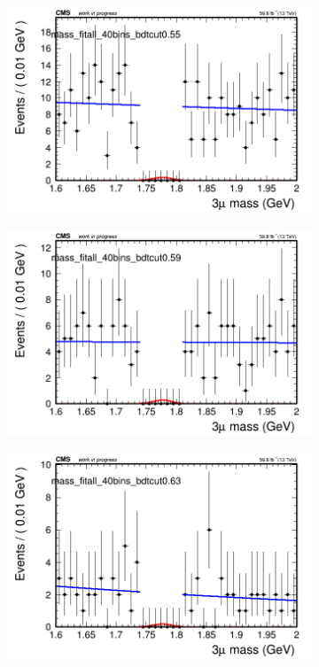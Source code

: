 \begin{figure}[H]
\begin{subfigure}{0.2\textwidth}
        \caption{}
    \end{subfigure}
    \begin{subfigure}{0.2\textwidth}
        \includegraphics[width=\textwidth]{unfixed_exp/plots/all/massfit_all_40bins_bdtcut0.55.png}
        \caption{}
    \end{subfigure}
    \begin{subfigure}{0.2\textwidth}
        \includegraphics[width=\textwidth]{unfixed_exp/plots/all/massfit_all_40bins_bdtcut0.59.png}
        \caption{}
    \end{subfigure}
    \begin{subfigure}{0.2\textwidth}
        \includegraphics[width=\textwidth]{unfixed_exp/plots/all/massfit_all_40bins_bdtcut0.63.png}

\end{subfigure}
\end{figure}
